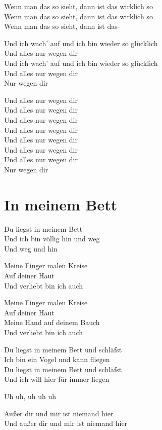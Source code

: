 \documentclass[]{book}
\begin{document}
Wenn man das so sieht, dann ist das wirklich so\\
Wenn man das so sieht, dann ist das wirklich so\\
Wenn man das so sieht, dann ist das-

Und ich wach' auf und ich bin wieder so glücklich\\
Und alles nur wegen dir\\
Und ich wach' auf und ich bin wieder so glücklich\\
Und alles nur wegen dir\\
Nur wegen dir

Und alles nur wegen dir\\
Und alles nur wegen dir\\
Und alles nur wegen dir\\
Und alles nur wegen dir\\
Und alles nur wegen dir\\
Und alles nur wegen dir\\
Und alles nur wegen dir\\
Nur wegen dir

\hypertarget{in-meinem-bett}{%
\section{In meinem Bett}\label{in-meinem-bett}}

Du liegst in meinem Bett\\
Und ich bin völlig hin und weg\\
Und weg und hin

Meine Finger malen Kreise\\
Auf deiner Haut\\
Und verliebt bin ich auch

Meine Finger malen Kreise\\
Auf deiner Haut\\
Meine Hand auf deinem Bauch\\
Und verliebt bin ich auch

Du liegst in meinem Bett und schläfst\\
Ich bin ein Vogel und kann fliegen\\
Du liegst in meinem Bett und schläfst\\
Und ich will hier für immer liegen

Uh uh, uh uh uh

Außer dir und mir ist niemand hier\\
Und außer dir und mir ist niemand hier
\end{document}
